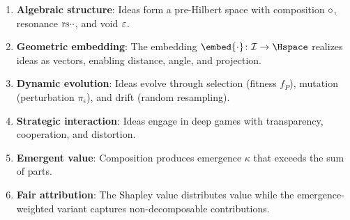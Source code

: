 \begin{definition}
\label{def:six-pillars}
\begin{enumerate}
\item \textbf{Algebraic structure}: Ideas form a pre-Hilbert space with
  composition $\circ$, resonance $\mathrm{rs}{\cdot}{\cdot}$, and void $\varepsilon$.
\item \textbf{Geometric embedding}: The embedding $\embed{\cdot}\colon
  \IS \to \Hspace$ realizes ideas as vectors, enabling distance, angle, and
  projection.
\item \textbf{Dynamic evolution}: Ideas evolve through selection (fitness
  $f_P$), mutation (perturbation $\pi_\epsilon$), and drift (random
  resampling).
\item \textbf{Strategic interaction}: Ideas engage in deep games with
  transparency, cooperation, and distortion.
\item \textbf{Emergent value}: Composition produces emergence $\kappa$
  that exceeds the sum of parts.
\item \textbf{Fair attribution}: The Shapley value distributes value while
  the emergence-weighted variant captures non-decomposable contributions.
\end{enumerate}
\end{definition}

